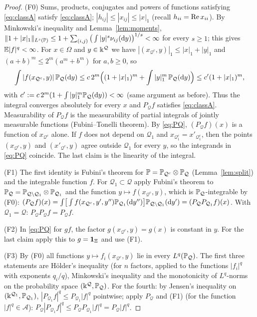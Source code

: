\begin{proof}
(F0) Sums, products, conjugates and powers of functions satisfying \eqref{eq:classA} satisfy \eqref{eq:classA}; $|h_{ij}|\le|x_{ij}|\le|x|_1$ (recall $h_{ii}=\operatorname{Re} x_{ii}$). By Minkowski's inequality and Lemma~\ref{lem:moments},
$\|1+|x|_1\|_{L^{s}(\mathbb{P})}\le1+\sum_{(i,j)}\big(\int|y|^{s}\nu_{ij}(\mathrm{d} y)\big)^{1/s}<\infty$ for every $s\ge1$; this gives $\mathbb{E}|f|^q<\infty$.
For $x\in\Omega$ and $y\in\Bbbk^{\mathcal Q}$ we have $|(x_{\mathcal Q^c},y)|_1\le|x|_1+|y|_1$ and $(a+b)^m\le2^m(a^m+b^m)$ for $a,b\ge0$, so
\[
 \int|f(x_{\mathcal Q^c},y)|\,\mathbb{P}_{\mathcal Q}(\mathrm{d} y)\le c\,2^m\Big((1+|x|_1)^m+\int|y|_1^m\,\mathbb{P}_{\mathcal Q}(\mathrm{d} y)\Big)\le c'(1+|x|_1)^m,
\]
with $c':=c\,2^m(1+\int|y|_1^m\mathbb{P}_{\mathcal Q}(\mathrm{d} y))<\infty$ (same argument as before). Thus the integral converges absolutely for every $x$ and $P_{\mathcal Q}f$ satisfies \eqref{eq:classA}. Measurability of $P_{\mathcal Q}f$ is the
measurability of partial integrals of jointly measurable functions (Fubini--Tonelli theorem). By \eqref{eq:PQ}, $(P_{\mathcal Q}f)(x)$ is a function of $x_{\mathcal Q^c}$ alone. If $f$ does not depend on $\mathcal Q_1$ and $x_{\mathcal Q_1^c}=x'_{\mathcal Q_1^c}$,
then the points $(x_{\mathcal Q^c},y)$ and $(x'_{\mathcal Q^c},y)$ agree outside $\mathcal Q_1$ for every $y$, so the integrands in \eqref{eq:PQ} coincide. The last claim is the linearity of the integral.

(F1) The first identity is Fubini's theorem for $\mathbb{P}=\mathbb{P}_{\mathcal Q^c}\otimes\mathbb{P}_{\mathcal Q}$ (Lemma~\ref{lem:split}) and the integrable function $f$. For $\mathcal Q_1\subset\mathcal Q$ apply Fubini's theorem to
$\mathbb{P}_{\mathcal Q}=\mathbb{P}_{\mathcal Q\setminus\mathcal Q_1}\otimes\mathbb{P}_{\mathcal Q_1}$ and the function $y\mapsto f(x_{\mathcal Q^c},y)$, which is $\mathbb{P}_{\mathcal Q}$-integrable by (F0):
$(P_{\mathcal Q}f)(x)=\int\!\big[\int f(x_{\mathcal Q^c},y',y'')\mathbb{P}_{\mathcal Q_1}(\mathrm{d} y'')\big]\mathbb{P}_{\mathcal Q\setminus\mathcal Q_1}(\mathrm{d} y')=(P_{\mathcal Q}P_{\mathcal Q_1}f)(x)$. With $\mathcal Q_1=\mathcal Q$: $P_{\mathcal Q}P_{\mathcal Q}f=P_{\mathcal Q}f$.

(F2) In \eqref{eq:PQ} for $gf$, the factor $g(x_{\mathcal Q^c},y)=g(x)$ is constant in $y$. For the last claim apply this to $g=\mathbf{1}_\Xi$ and use (F1).

(F3) By (F0) all functions $y\mapsto f_i(x_{\mathcal Q^c},y)$ lie in every $L^q(\mathbb{P}_{\mathcal Q})$. The first three statements are H\"older's inequality (for $n$ factors, applied to the functions $|f_i|^q$ with exponents $q_i/q$), Minkowski's inequality and the monotonicity of $L^q$-norms on the probability space $(\Bbbk^{\mathcal Q},\mathbb{P}_{\mathcal Q})$.
For the fourth: by Jensen's inequality on $(\Bbbk^{\mathcal Q_1},\mathbb{P}_{\mathcal Q_1})$, $|P_{\mathcal Q_1}f|^q\le P_{\mathcal Q_1}|f|^q$ pointwise; apply $P_{\mathcal Q}$ and (F1) (for the function $|f|^q\in\mathcal A$): $P_{\mathcal Q}|P_{\mathcal Q_1}f|^q\le P_{\mathcal Q}P_{\mathcal Q_1}|f|^q=P_{\mathcal Q}|f|^q$.


\end{proof}
